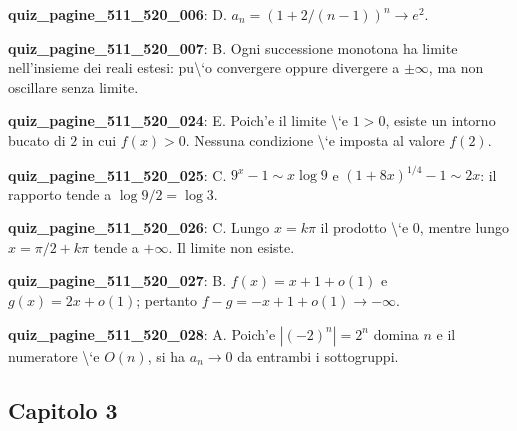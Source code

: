 \documentclass[11pt,a4paper]{article}
\newcounter{quiz}
\begin{document}
\noindent\textbf{quiz\_pagine\_511\_520\_006}: D. $a_n=(1+2/(n-1))^n\to e^2$.\par\medskip
\noindent\textbf{quiz\_pagine\_511\_520\_007}: B. Ogni successione monotona ha limite nell'insieme dei reali estesi: pu\textbackslash{}`o convergere oppure divergere a $\pm\infty$, ma non oscillare senza limite.\par\medskip
\noindent\textbf{quiz\_pagine\_511\_520\_024}: E. Poich'e il limite \textbackslash{}`e $1>0$, esiste un intorno bucato di $2$ in cui $f(x)>0$. Nessuna condizione \textbackslash{}`e imposta al valore $f(2)$.\par\medskip
\noindent\textbf{quiz\_pagine\_511\_520\_025}: C. $9^x-1\sim x\log9$ e $(1+8x)^{1/4}-1\sim2x$: il rapporto tende a $\log9/2=\log3$.\par\medskip
\noindent\textbf{quiz\_pagine\_511\_520\_026}: C. Lungo $x=k\pi$ il prodotto \textbackslash{}`e $0$, mentre lungo $x=\pi/2+k\pi$ tende a $+\infty$. Il limite non esiste.\par\medskip
\noindent\textbf{quiz\_pagine\_511\_520\_027}: B. $f(x)=x+1+o(1)$ e $g(x)=2x+o(1)$; pertanto $f-g=-x+1+o(1)\to-\infty$.\par\medskip
\noindent\textbf{quiz\_pagine\_511\_520\_028}: A. Poich'e $|(-2)^n|=2^n$ domina $n$ e il numeratore \textbackslash{}`e $O(n)$, si ha $a_n\to0$ da entrambi i sottogruppi.\par\medskip
\subsection*{Capitolo 3}
\end{document}
